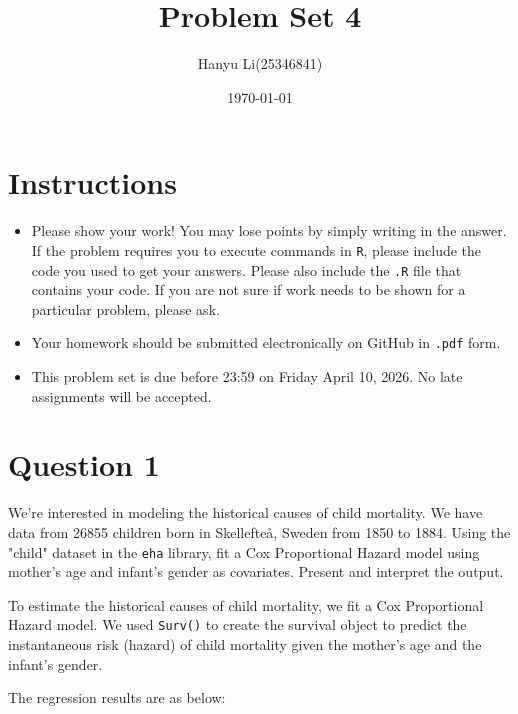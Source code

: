 \documentclass[12pt,letterpaper]{article}
\title{Problem Set 4}
\date{\today}
\author{Hanyu Li(25346841)}
\begin{document}
	\setlength{\parindent}{0pt}
	\setlength{\parskip}{0.8em}
	
	\maketitle
	
	\section*{Instructions}
	\begin{itemize}
		\item Please show your work! You may lose points by simply writing in the answer. If the problem requires you to execute commands in \texttt{R}, please include the code you used to get your answers. Please also include the \texttt{.R} file that contains your code. If you are not sure if work needs to be shown for a particular problem, please ask.
		\item Your homework should be submitted electronically on GitHub in \texttt{.pdf} form.
		\item This problem set is due before 23:59 on Friday April 10, 2026. No late assignments will be accepted.
	\end{itemize}
	
	\vspace{1.5cm}
	
	\section*{Question 1}
	
	We're interested in modeling the historical causes of child mortality. We have data from 26855 children born in Skellefteå, Sweden from 1850 to 1884. Using the "child" dataset in the \texttt{eha} library, fit a Cox Proportional Hazard model using mother's age and infant's gender as covariates. Present and interpret the output.
	
	\vspace{0.5cm}
	
	To estimate the historical causes of child mortality, we fit a Cox Proportional Hazard model. We used \texttt{Surv()} to create the survival object to predict the instantaneous risk (hazard) of child mortality given the mother's age and the infant's gender.
	
	
	
	The regression results are as below:
	
\end{document}
